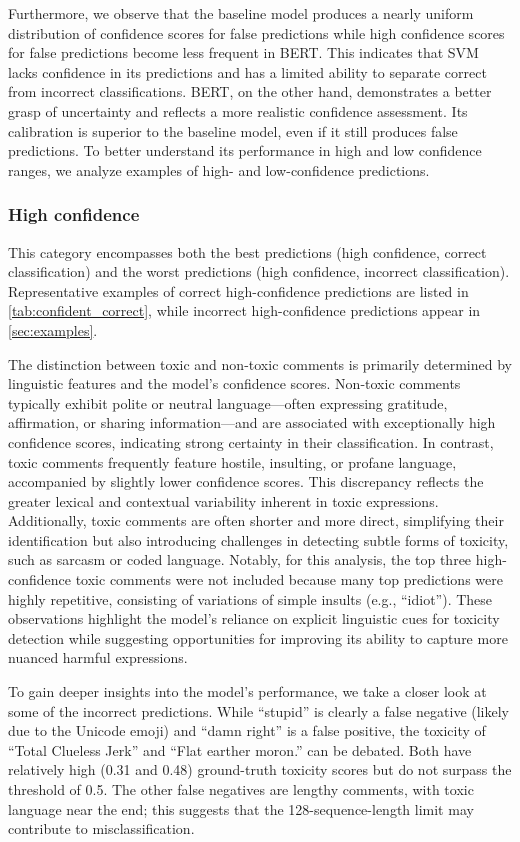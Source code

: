 Furthermore, we observe that the baseline model produces a nearly uniform distribution of confidence scores for false predictions while high confidence scores for false predictions become less frequent in BERT. This indicates that SVM lacks confidence in its predictions and has a limited ability to separate correct from incorrect classifications. BERT, on the other hand, demonstrates a better grasp of uncertainty and reflects a more realistic confidence assessment. Its calibration is superior to the baseline model, even if it still produces false predictions. To better understand its performance in high and low confidence ranges, we analyze examples of high- and low-confidence predictions.

\subsubsection{High confidence}
This category encompasses both the best predictions (high confidence, correct classification) and the worst predictions (high confidence, incorrect classification). Representative examples of correct high-confidence predictions are listed in \cref{tab:confident_correct}, while incorrect high-confidence predictions appear in \cref{sec:examples}.

The distinction between toxic and non-toxic comments is primarily determined by linguistic features and the model's confidence scores. Non-toxic comments typically exhibit polite or neutral language—often expressing gratitude, affirmation, or sharing information—and are associated with exceptionally high confidence scores, indicating strong certainty in their classification. In contrast, toxic comments frequently feature hostile, insulting, or profane language, accompanied by slightly lower confidence scores. This discrepancy reflects the greater lexical and contextual variability inherent in toxic expressions. Additionally, toxic comments are often shorter and more direct, simplifying their identification but also introducing challenges in detecting subtle forms of toxicity, such as sarcasm or coded language. Notably, for this analysis, the top three high-confidence toxic comments were not included because many top predictions were highly repetitive, consisting of variations of simple insults (e.g., “idiot”). These observations highlight the model’s reliance on explicit linguistic cues for toxicity detection while suggesting opportunities for improving its ability to capture more nuanced harmful expressions.

To gain deeper insights into the model's performance, we take a closer look at some of the incorrect predictions. While “stupid” is clearly a false negative (likely due to the Unicode emoji) and “damn right” is a false positive, the toxicity of “Total Clueless Jerk” and “Flat earther moron.” can be debated. Both have relatively high (0.31 and 0.48) ground-truth toxicity scores but do not surpass the threshold of 0.5. The other false negatives are lengthy comments, with toxic language near the end; this suggests that the 128-sequence-length limit may contribute to misclassification.

